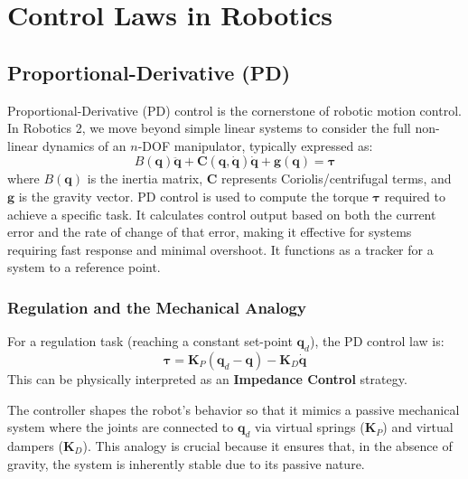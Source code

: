 \section{Control Laws in Robotics}

\subsection{Proportional-Derivative (PD)}
\label{subsec:pd_control}

Proportional-Derivative (PD) control is the cornerstone of robotic motion control. In Robotics 2,
 we move beyond simple linear systems to consider the full non-linear dynamics of an $n$-DOF manipulator, typically expressed as:
\begin{equation}
    B(\bm{q})\ddot{\bm{q}} + \bm{C}(\bm{q}, \dot{\bm{q}})\dot{\bm{q}} + \bm{g}(\bm{q}) = \bm{\tau}
\end{equation}
where $B(\bm{q})$ is the inertia matrix, $\bm{C}$ represents Coriolis/centrifugal terms, and $\bm{g}$ is the gravity vector. 
PD control is used to compute the torque $\bm{\tau}$ required to achieve a specific task.
It calculates control output based on both the current error and the rate of change of that error, making it effective for systems
requiring fast response and minimal overshoot.
It functions as a tracker for a system to a reference point.

\subsubsection{Regulation and the Mechanical Analogy}
For a regulation task (reaching a constant set-point $\bm{q}_d$), the PD control law is:
\begin{equation}
    \bm{\tau} = \bm{K}_P (\bm{q}_d - \bm{q}) - \bm{K}_D \dot{\bm{q}}
\end{equation}
This can be physically interpreted as an \textbf{Impedance Control} strategy. 

The controller shapes the robot's behavior so that it mimics a passive mechanical system where the joints are connected to $\bm{q}_d$ via virtual springs ($\bm{K}_P$)
and virtual dampers ($\bm{K}_D$). This analogy is crucial because it ensures that, in the absence of gravity, the system is inherently stable due to its passive nature.

